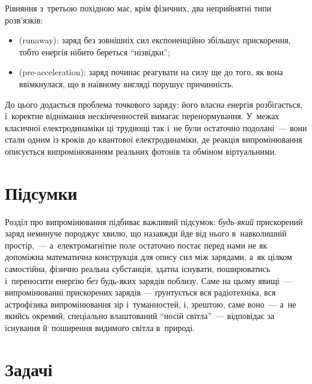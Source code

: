 \begin{Attention}
	Рівняння з~третьою похідною має, крім фізичних, два неприйнятні типи розв'язків:
	\begin{itemize}
		\item {} (runaway): заряд без зовнішніх сил експоненційно
		  збільшує прискорення, тобто енергія нібито береться \enquote{нізвідки};
		\item {} (pre-acceleration): заряд починає реагувати на силу
		  ще до того, як вона ввімкнулася, що в наївному вигляді порушує причинність.
	\end{itemize}
	До цього додається проблема точкового заряду: його власна енергія розбігається,
	і~коректне віднімання нескінченностей вимагає перенормування. У~межах класичної
	електродинаміки ці труднощі так і~не були остаточно подолані~--- вони стали одним із
	кроків до квантової електродинаміки, де реакція випромінювання описується
	випромінюванням реальних фотонів та обміном віртуальними.
\end{Attention}



\section*{Підсумки}

Розділ про випромінювання підбиває важливий підсумок: \emph{будь-який} прискорений заряд неминуче породжує хвилю, що назавжди йде
від нього в~навколишній простір,~--- а~електромагнітне поле остаточно постає перед нами не
як допоміжна математична конструкція для опису сил між зарядами, а~як цілком самостійна,
фізично реальна субстанція, здатна існувати, поширюватись і~переносити енергію \emph{без}
будь-яких зарядів поблизу. Саме на цьому явищі~--- випромінюванні прискорених зарядів ---
ґрунтується вся радіотехніка, вся астрофізика випромінювання зір і~туманностей, і,
зрештою, саме воно~--- а~не якийсь окремий, спеціально влаштований \enquote{носій
світла}~--- відповідає за існування й~поширення видимого світла в~природі.



\section*{Задачі}



